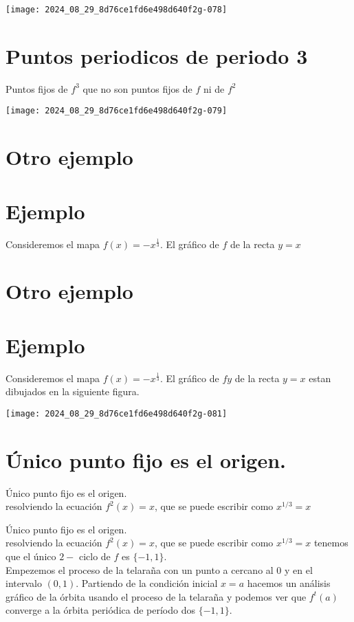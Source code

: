 \documentclass[11pt]{beamer}
\begin{document}
\begin{center}
\texttt{[image: 2024\_08\_29\_8d76ce1fd6e498d640f2g-078]}
\end{center}

\section*{Puntos periodicos de periodo 3}
Puntos fijos de $f^{3}$ que no son puntos fijos de $f$ ni de $f^{2}$

\begin{center}
\texttt{[image: 2024\_08\_29\_8d76ce1fd6e498d640f2g-079]}
\end{center}

\section*{Otro ejemplo}
\section*{Ejemplo}
Consideremos el mapa $f(x)=-x^{\frac{1}{3}}$. El gráfico de $f$ de la recta $y=x$

\section*{Otro ejemplo}
\section*{Ejemplo}
Consideremos el mapa $f(x)=-x^{\frac{1}{3}}$. El gráfico de $f y$ de la recta $y=x$ estan dibujados en la siguiente figura.

\begin{center}
\texttt{[image: 2024\_08\_29\_8d76ce1fd6e498d640f2g-081]}
\end{center}

\section*{Único punto fijo es el origen.}
Único punto fijo es el origen.\\
resolviendo la ecuación $f^{2}(x)=x$, que se puede escribir como $x^{1 / 3}=x$

Único punto fijo es el origen.\\
resolviendo la ecuación $f^{2}(x)=x$, que se puede escribir como $x^{1 / 3}=x$ tenemos que el único $2-$ ciclo de $f$ es $\{-1,1\}$.\\
Empezemos el proceso de la telaraña con un punto a cercano al 0 y en el intervalo $(0,1)$. Partiendo de la condición inicial $x=a$ hacemos un análisis gráfico de la órbita usando el proceso de la telaraña y podemos ver que $f^{t}(a)$ converge a la órbita periódica de período dos $\{-1,1\}$.
\end{document}
